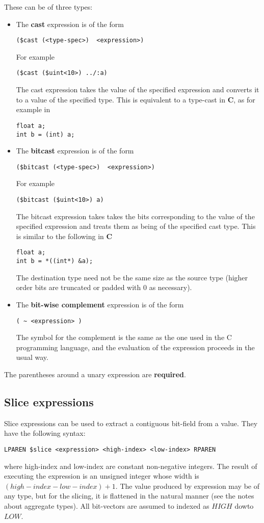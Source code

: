 \documentclass{article}
\begin{document}
These can be of three types:
\begin{itemize}
\item 
The {\bf cast}
expression is of the form
\begin{verbatim}
($cast (<type-spec>)  <expression>)
\end{verbatim} %
For example
\begin{verbatim}
($cast ($uint<10>) ../:a)
\end{verbatim}
The cast expression takes the value of the
specified expression and converts it to a value
of the specified type.  This is equivalent
to a type-cast in {\bf C}, as for example
in
\begin{verbatim}
float a;
int b = (int) a;
\end{verbatim}

\item 
The {\bf bitcast}
expression is of the form
\begin{verbatim}
($bitcast (<type-spec>)  <expression>)
\end{verbatim} %
For example
\begin{verbatim}
($bitcast ($uint<10>) a)
\end{verbatim}
The bitcast expression takes takes the bits
corresponding to the value of the specified expression
and treats them as being of the specified cast type.
This is similar to the following in {\bf C}
\begin{verbatim}
float a;
int b = *((int*) &a);
\end{verbatim}
The destination type need not
be the same size as the source type (higher
order bits are truncated or padded with 0
as necessary).
\item 
The {\bf bit-wise complement} expression is of the form
\begin{verbatim}
( ~ <expression> )
\end{verbatim}
The symbol for the complement is the same
as the one used in the C programming language,
and the evaluation of the expression proceeds in the
usual way.
\end{itemize}

The parentheses around a unary expression are
{\bf required}.

\subsection{Slice expressions}

Slice expressions can be used to extract a contiguous
bit-field from a value.  They have the
following syntax:
\begin{verbatim}
LPAREN $slice <expression> <high-index> <low-index> RPAREN
\end{verbatim}
where high-index and low-index are constant non-negative
integers.  The result of executing the expression is
an unsigned integer whose width is $(high-index - low-index)+1$.
The value produced by expression may be of any type, but
for the slicing, it is flattened in the natural manner
(see the notes about aggregate types).  All bit-vectors
are assumed to indexed as $HIGH$ dowto $LOW$.
\end{document}
